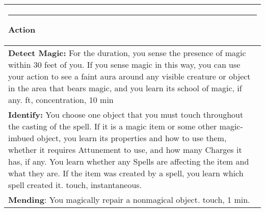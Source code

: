 \documentclass[twocolumn]{article}
\begin{document}

\\
\noindent\begin{tabular}{|m{3.1in}|}
\hline
\rule{1.25in}{0pt}Action\\
\hline
\textbf{Detect Magic:}
For the duration, you sense the presence of magic within 30 feet of you. If you sense magic in this way, you can use your action to see a faint aura around any visible creature or object in the area that bears magic, and you learn its school of magic, if any.  {\sc 30 ft, concentration, 10 min}\\
\textbf{Identify:}
You choose one object that you must touch throughout the casting of the spell. If it is a magic item or some other magic-imbued object, you learn its properties and how to use them, whether it requires Attunement to use, and how many Charges it has, if any. You learn whether any Spells are affecting the item and what they are. If the item was created by a spell, you learn which spell created it. {\sc touch, instantaneous}.\\
\textbf{Mending}: You magically repair a nonmagical object. {\sc touch, 1 min.}\\
\hline
\end{tabular}
\vspace{8pt}
\end{document}
